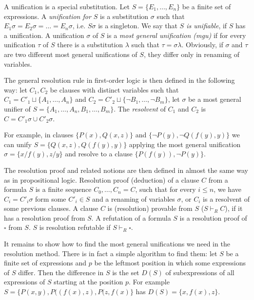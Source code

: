 A unification is a special substitution. Let $S = \{E_1, \dots, E_n\}$ be a finite set of expressions. A \emph{unification for $S$} is a substitution $\sigma$ such that $E_1 \sigma = E_2 \sigma = \dots = E_n \sigma$, i.e. $S \sigma$ is a singleton. We say that \emph{$S$ is unifiable}, if $S$ has a unification. A unification $\sigma$ of $S$ is a \emph{most general unification (mgu)} if for every unification $\tau$ of $S$ there is a substitution $\lambda$ such that $\tau = \sigma \lambda$. Obviously, if $\sigma$ and $\tau$ are two different most general unifications of $S$, they differ only in renaming of variables.

The general resolution rule in first-order logic is then defined in the following way: let $C_1, C_2$ be clauses with distinct variables such that $C_1 = C'_1 \sqcup \{A_1, \dots, A_n\}$ and $C_2 = C'_2 \sqcup \{\neg B_1, \dots, \neg B_m\}$, let $\sigma$ be a most general unifier of $S = \{A_1, \dots, A_n, B_1, \dots, B_m\}$. The \emph{resolvent} of $C_1$ and $C_2$ is $C = C'_1 \sigma \cup C'_2 \sigma$.

For example, in clauses $\{P(x), Q(x,z)\}$ and $\{\neg P(y), \neg Q(f(y), y)\}$ we can unify $S = \{Q(x,z), Q(f(y),y)\}$ applying the most general unification $\sigma = \{x/f(y), z/y\}$ and resolve to a clause $\{P(f(y)), \neg P(y)\}$.

The resolution proof and related notions are then defined in almost the same way as in propositional logic. Resolution proof (deduction) of a clause $C$ from a formula $S$ is a finite sequence $C_0, \dots, C_n = C$, such that for every $i \leq n$, we have $C_i = C'_i \sigma$ form some $C'_i \in S$ and a renaming of variables $\sigma$, or $C_i$ is a resolvent of some previous clauses. A clause $C$ is (resolution) provable from $S$ ($S \vdash_R C$), if it has a resolution proof from $S$. A refutation of a formula $S$ is a resolution proof of $\square$ from $S$. $S$ is resolution refutable if $S \vdash_R \square$.

It remains to show how to find the most general unifications we need in the resolution method. There is in fact a simple algorithm to find them: let $S$ be a finite set of expressions and $p$ be the leftmost position in which some expressions of $S$ differ. Then the difference in $S$ is the set $D(S)$ of subexpressions of all expressions of $S$ starting at the position $p$. For example $S = \{P(x,y), P((f(x), z), P(z, f(x)\}$ has $D(S) = \{x, f(x), z\}$.

